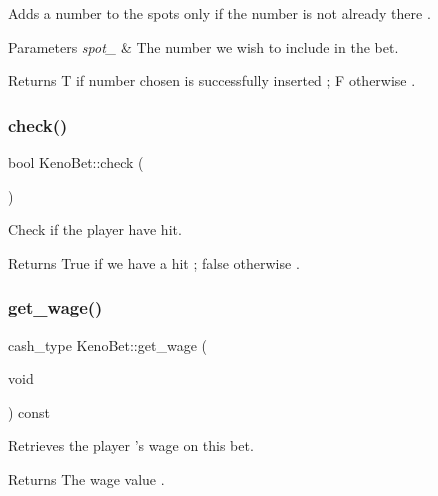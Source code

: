 Adds a number to the spots only if the number is not already there . 


\begin{DoxyParams}{Parameters}
{\em spot\+\_\+} & The number we wish to include in the bet. \\
\hline
\end{DoxyParams}
\begin{DoxyReturn}{Returns}
T if number chosen is successfully inserted ; F otherwise . 
\end{DoxyReturn}
\mbox{\label{class_keno_bet_a433e47b1968b0338ceecdd525a276f5e}} 
\subsubsection{\texorpdfstring{check()}{check()}}
{\footnotesize\ttfamily bool Keno\+Bet\+::check (\begin{DoxyParamCaption}{ }\end{DoxyParamCaption})}



Check if the player have hit. 

\begin{DoxyReturn}{Returns}
True if we have a hit ; false otherwise . 
\end{DoxyReturn}
\mbox{\label{class_keno_bet_a5900dbff144d148671c015278261396e}} 
\subsubsection{\texorpdfstring{get\+\_\+wage()}{get\_wage()}}
{\footnotesize\ttfamily cash\+\_\+type Keno\+Bet\+::get\+\_\+wage (\begin{DoxyParamCaption}\item[{void}]{ }\end{DoxyParamCaption}) const}

Retrieves the player ’s wage on this bet. \begin{DoxyReturn}{Returns}
The wage value . 
\end{DoxyReturn}
\mbox{\label{class_keno_bet_a4f059f08a41fc0f41e30cf5dd7014d8f}} 
